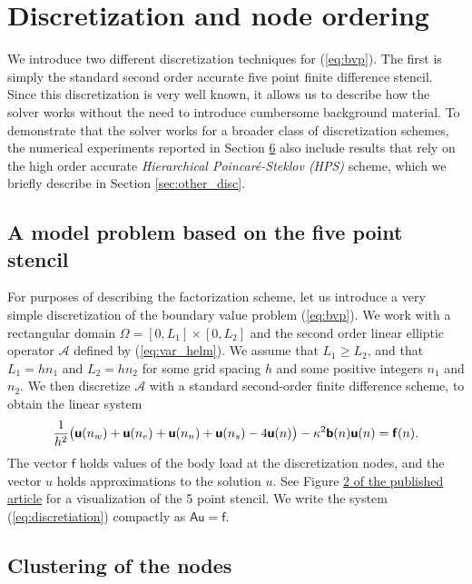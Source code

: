 \documentclass[10pt,a4paper]{amsart}
\newcommand{\vct}[1]{\bm{\mathsf{#1}}}
\newcommand{\mtx}[1]{\bm{\mathsf{#1}}}
\begin{document}
\section{Discretization and node ordering}

We introduce two different discretization techniques for
(\ref{eq:bvp}). The first is simply the standard second order accurate
five point finite difference stencil. Since this discretization is very 
well known, it allows us to describe how the solver works without the need
to introduce cumbersome background material. To demonstrate that the solver
works for a broader class of discretization schemes, the numerical experiments
reported in Section \href{https://arxiv.org/abs/2211.07572v3}{6} also include results that rely on the high 
order accurate \textit{Hierarchical Poincar\'e-Steklov (HPS)} scheme, which
we briefly describe in Section \ref{sec:other_disc}.

\subsection{A model problem based on the five point stencil}
\label{sec:modeldisc}

For purposes of describing the factorization scheme, let us introduce a very
simple discretization of the boundary value problem (\ref{eq:bvp}).
We work 
with a rectangular domain $\Omega=[0,L_1] \times [0,L_2]$ and the second order
linear elliptic operator $\mathcal A$ defined by (\ref{eq:var_helm}). We assume 
that $L_1 \ge L_2$, and that $L_{1} = hn_{1}$ and $L_{2} = hn_{2}$ for some grid 
spacing $h$ and some positive integers $n_{1}$ and $n_{2}$.
We then
discretize $\mathcal{A}$ with a standard second-order finite difference scheme,
to obtain the linear system
\begin{equation}
\label{eq:discretiation}
\frac 1 {h^2} 
\bigl(
\vct{u}(n_{\rm w}) + 
\vct{u}(n_{\rm e}) +
\vct{u}(n_{\rm n}) +
\vct{u}(n_{\rm s}) -
4 \vct{u}(n)
\bigr)
- \kappa^2 \vct{b}(n)\vct{u}(n)
=
\vct{f}(n).
\end{equation}
The vector $\vct{f}$ holds values of the body load at the discretization nodes, and the vector $u$ holds approximations to the solution $u$. 
See Figure \href{https://arxiv.org/abs/2211.07572v3}{2 of the published article} for a visualization of the 5 point stencil. 
We write the system (\ref{eq:discretiation}) compactly as
$\mtx{A}\vct{u} = \vct{f}$.


\subsection{Clustering of the nodes}
\label{sec:clustering}
\end{document}
